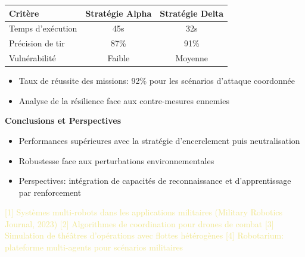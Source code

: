\documentclass[a0,landscape]{a0poster}
\renewcommand{\subsection}[1]{\noindent\color{militarygreen}\large\bfseries #1\\[0.3ex]}
\begin{document}
\begin{center}
\begin{minipage}[t]{0.49\linewidth}
\begin{militarybox}
    \vspace{0.5ex}
    \begin{center}
        \footnotesize
        \begin{tabular}{lcc}
            \toprule
            \textbf{Critère} & \textbf{Stratégie Alpha} & \textbf{Stratégie Delta} \\
            \midrule
            Temps d'exécution & 45s & 32s \\
            Précision de tir & 87\% & 91\% \\
            Vulnérabilité & Faible & Moyenne \\
            \bottomrule
        \end{tabular}
    \end{center}
    \end{militarybox}
\end{minipage}
\hfill
\begin{minipage}[t]{0.49\linewidth}
    \begin{militarybox}
    \begin{itemize}
        \item Taux de réussite des missions: 92\% pour les scénarios d'attaque coordonnée
        \item Analyse de la résilience face aux contre-mesures ennemies
    \end{itemize}
    
    \vspace{0.5cm}
    \subsection{Conclusions et Perspectives}
    \begin{itemize}
        \item Performances supérieures avec la stratégie d'encerclement puis neutralisation
        \item Robustesse face aux perturbations environnementales
        \item Perspectives: intégration de capacités de reconnaissance et d'apprentissage par renforcement
    \end{itemize}
    \end{militarybox}
\end{minipage}
\end{center}

\vfill
\begin{militarybox}
\begin{flushleft}
\footnotesize\textcolor{khaki}{
{[}1{]} Systèmes multi-robots dans les applications militaires (Military Robotics Journal, 2023) \hfill
{[}2{]} Algorithmes de coordination pour drones de combat \hfill
{[}3{]} Simulation de théâtres d'opérations avec flottes hétérogènes \hfill
{[}4{]} Robotarium: plateforme multi-agents pour scénarios militaires
}
\end{flushleft}
\end{militarybox}
\end{document}
